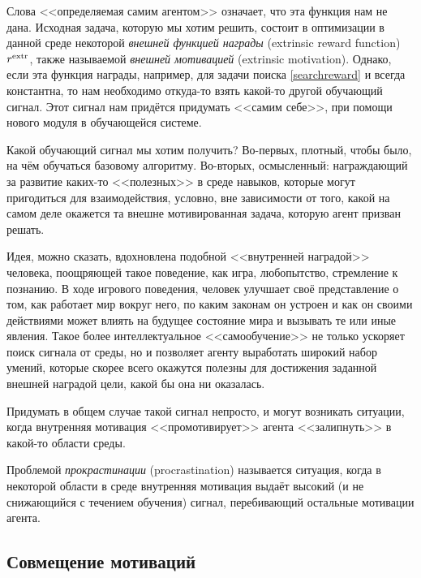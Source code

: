 Слова <<определяемая самим агентом>> означает, что эта функция нам не дана. Исходная задача, которую мы хотим решить, состоит в оптимизации в данной среде некоторой \emph{внешней функцией награды} (extrinsic reward function) $r^{\mathrm{extr}}$, также называемой \emph{внешней мотивацией} (extrinsic motivation). Однако, если эта функция награды, например, для задачи поиска \eqref{searchreward} и всегда константна, то нам необходимо откуда-то взять какой-то другой обучающий сигнал. Этот сигнал нам придётся придумать <<самим себе>>, при помощи нового модуля в обучающейся системе.

Какой обучающий сигнал мы хотим получить? Во-первых, плотный, чтобы было, на чём обучаться базовому алгоритму. Во-вторых, осмысленный: награждающий за развитие каких-то <<полезных>> в среде навыков, которые могут пригодиться для взаимодействия, условно, вне зависимости от того, какой на самом деле окажется та внешне мотивированная задача, которую агент призван решать.

\begin{example}
Идея, можно сказать, вдохновлена подобной <<внутренней наградой>> человека, поощряющей такое поведение, как игра, любопытство, стремление к познанию. В ходе игрового поведения, человек улучшает своё представление о том, как работает мир вокруг него, по каким законам он устроен и как он своими действиями может влиять на будущее состояние мира и вызывать те или иные явления. Такое более интеллектуальное <<самообучение>> не только ускоряет поиск сигнала от среды, но и позволяет агенту выработать широкий набор умений, которые скорее всего окажутся полезны для достижения заданной внешней наградой цели, какой бы она ни оказалась.
\end{example}

Придумать в общем случае такой сигнал непросто, и могут возникать ситуации, когда внутренняя мотивация <<промотивирует>> агента <<залипнуть>> в какой-то области среды.

\begin{definition}
Проблемой \emph{прокрастинации} (procrastination) называется ситуация, когда в некоторой области в среде внутренняя мотивация выдаёт высокий (и не снижающийся с течением обучения) сигнал, перебивающий остальные мотивации агента.
\end{definition}

\subsection{Совмещение мотиваций}

